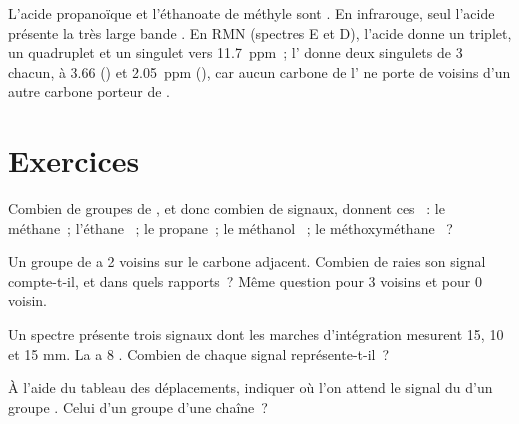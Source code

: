 \begin{example}\label{ex:g12:proton-nmr:isomers}
L'acide propanoïque  et l'éthanoate de méthyle
 sont . En infrarouge, seul l'acide présente la
très large bande . En RMN (spectres E et D), l'acide donne un
triplet, un quadruplet et un singulet vers \qty{11.7}{ppm}~; l'
donne deux singulets de 3  chacun, à 3.66 () et
\qty{2.05}{ppm} (), car aucun carbone de l' ne porte de
 voisins d'un autre carbone porteur de .
\end{example}

\section{Exercices}

\begin{exercise}[$\star$]\label{exo:g12:proton-nmr:1}
Combien de groupes de , et donc combien de signaux,
donnent ces ~: le méthane~; l'éthane ~; le
propane~; le méthanol ~; le méthoxyméthane ~?
\end{exercise}

\begin{exercise}[$\star$]\label{exo:g12:proton-nmr:2}
Un groupe de  a 2  voisins sur le carbone adjacent.
Combien de raies son signal compte-t-il, et dans quels rapports~? Même
question pour 3 voisins et pour 0 voisin.
\end{exercise}

\begin{exercise}[$\star$]\label{exo:g12:proton-nmr:3}
Un spectre présente trois signaux dont les marches d'intégration mesurent
15, 10 et 15 mm. La  a 8 . Combien de  chaque
signal représente-t-il~?
\end{exercise}

\begin{exercise}[$\star$]\label{exo:g12:proton-nmr:4}
À l'aide du tableau des déplacements, indiquer où l'on attend le signal
du  d'un groupe . Celui d'un groupe  d'une
chaîne~?
\end{exercise}

